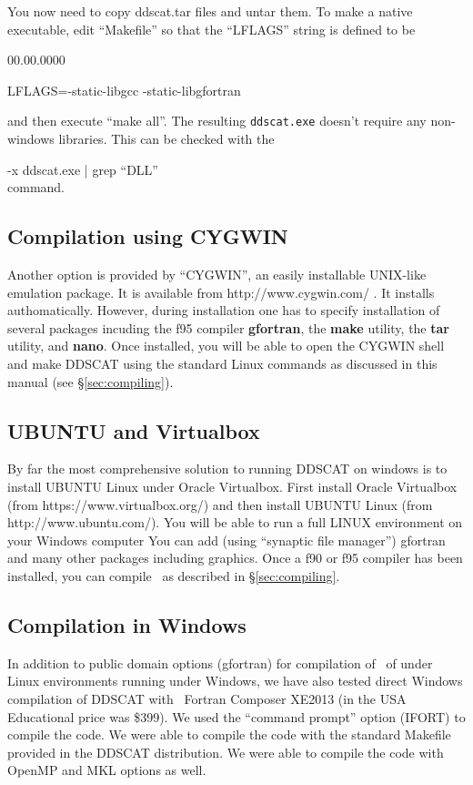 You now need to copy ddscat.tar files and untar them. To make a native
executable, edit ``Makefile'' so that the ``LFLAGS'' string is defined to be
\begin{lyxlist}{00.00.0000}
\item [{LFLAGS=-static-libgcc}] -static-libgfortran
\end{lyxlist}
and then execute {}``make all''. The resulting {\tt ddscat.exe} doesn't require
any non-windows libraries. This can be checked with the

\indent{} -x ddscat.exe | grep {}``DLL''\\
command.


\subsection{Compilation using CYGWIN}

Another option is provided by ``CYGWIN'',
an easily installable UNIX-like emulation package.
It is available from http://www.cygwin.com/ . It installs authomatically.
However, during installation one has to specify installation of several
packages incuding the f95 compiler {\bf gfortran}, the {\bf make} utility, 
the {\bf tar} utility, and {\bf nano}. 
Once installed, you will be able
to open the CYGWIN shell and make DDSCAT using the standard
Linux commands as discussed in this manual (see \S\ref{sec:compiling}).


\subsection{UBUNTU and Virtualbox}

By far the most comprehensive solution to running DDSCAT on windows
is to install UBUNTU Linux under Oracle Virtualbox. First install
Oracle Virtualbox (from https://www.virtualbox.org/) and then
install UBUNTU Linux
(from http://www.ubuntu.com/). You will be able to run a full LINUX
environment
on your Windows computer 
You can add (using {}``synaptic file manager'')
gfortran and many other packages including graphics. 
Once a f90 or f95 compiler has been installed, you can compile \ddscat\ as
described in \S\ref{sec:compiling}.

\subsection{Compilation in Windows}

In addition to public domain options (gfortran) for compilation of \ddscatv\ of
under Linux environments running under Windows, 
we have also tested direct Windows compilation of DDSCAT with
\Intel\ Fortran
Composer XE2013 (in the USA Educational price was \$399). 
We used the
``command prompt'' option (IFORT) to compile the code. We were able to
compile the code with the standard Makefile provided in the DDSCAT
distribution.
We were able to compile the code with OpenMP and MKL options as well.

